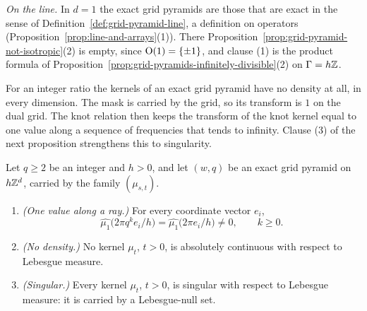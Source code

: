 \emph{On the line.} In $d = 1$ the exact grid pyramids are those that are exact in the sense of
Definition~\ref{def:grid-pyramid-line}, a definition on operators
(Proposition~\ref{prop:line-and-arrays}(1)). There Proposition~\ref{prop:grid-pyramid-not-isotropic}(2)
is empty, since $\mathrm{O}(1) = \{\pm 1\}$, and clause (1) is the product formula of
Proposition~\ref{prop:grid-pyramids-infinitely-divisible}(2) on $\Gamma = h\mathbb{Z}$.

For an integer ratio the kernels of an exact grid pyramid have no density at all, in every
dimension. The mask is carried by the grid, so its transform is $1$ on the dual grid. The knot
relation then keeps the transform of the knot kernel equal to one value along a sequence of
frequencies that tends to infinity. Clause (3) of the next proposition strengthens this to
singularity.

\begin{proposition}
\label{prop:grid-pyramid-singular-kernels}

Let $q \ge 2$ be an integer and $h > 0$, and let $(w, q)$ be an exact grid pyramid on $h\mathbb{Z}^d$,
carried by the family $(\mu_{s,t})$.
\begin{enumerate}
\item \emph{(One value along a ray.)} For every coordinate vector $e_i$,
\[
  \widehat{\mu_1}\bigl(2\pi q^ke_i/h\bigr) = \widehat{\mu_1}\bigl(2\pi e_i/h\bigr) \ne 0,
  \qquad k \ge 0 .
\]
\item \emph{(No density.)} No kernel $\mu_t$, $t > 0$, is absolutely continuous with respect to
Lebesgue measure.
\item \emph{(Singular.)} Every kernel $\mu_t$, $t > 0$, is singular with respect to Lebesgue
measure: it is carried by a Lebesgue-null set.
\end{enumerate}
\end{proposition}

